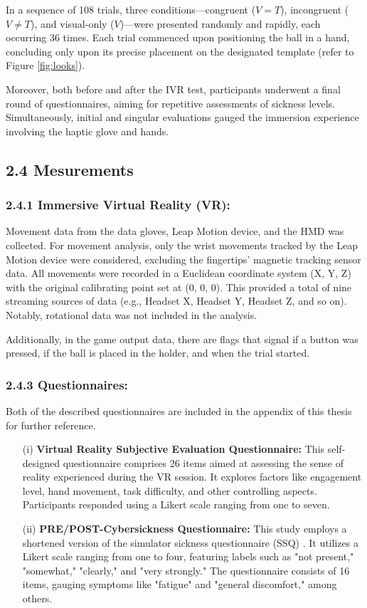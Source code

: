 \documentclass[12pt,oneside,openright]{report}
\begin{document}
In a sequence of 108 trials, three conditions—congruent ($V=T$), incongruent ($V \neq T$), and visual-only ($V$)—were presented randomly and rapidly, each occurring 36 times. Each trial commenced upon positioning the ball in a hand, concluding only upon its precise placement on the designated template (refer to Figure \ref{fig:looks}).

Moreover, both before and after the IVR test, participants underwent a final round of questionnaires, aiming for repetitive assessments of sickness levels. Simultaneously, initial and singular evaluations gauged the immersion experience involving the haptic glove and hands.


\subsection*{2.4 Mesurements}
\subsubsection*{2.4.1 Immersive Virtual Reality (VR):}

 Movement data from the data gloves, Leap Motion device, and the HMD was collected. For movement analysis, only the wrist movements tracked by the Leap Motion device were considered, excluding the fingertips' magnetic tracking sensor data. All movements were recorded in a Euclidean coordinate system (X, Y, Z) with the original calibrating point set at (0, 0, 0). This provided a total of nine streaming sources of data (e.g., Headset X, Headset Y, Headset Z, and so on). Notably, rotational data was not included in the analysis.

Additionally, in the game output data, there are flags that signal if a button was pressed, if the ball is placed in the holder, and when the trial started.

\subsubsection*{2.4.3 Questionnaires:}
Both of the described questionnaires are included in the appendix of this thesis for further reference.

\begin{enumerate}
\item[(i)] \textbf{Virtual Reality Subjective Evaluation Questionnaire:} This self-designed questionnaire comprises 26 items aimed at assessing the sense of reality experienced during the VR session. It explores factors like engagement level, hand movement, task difficulty, and other controlling aspects. Participants responded using a Likert scale ranging from one to seven.

\item[(ii)] \textbf{PRE/POST-Cybersickness Questionnaire:} This study employs a shortened version of the simulator sickness questionnaire (SSQ) \parencite*{avpsy}. It utilizes a Likert scale ranging from one to four, featuring labels such as "not present," "somewhat," "clearly," and "very strongly." The questionnaire consists of 16 items, gauging symptoms like "fatigue" and "general discomfort," among others.
\end{enumerate}
\end{document}
